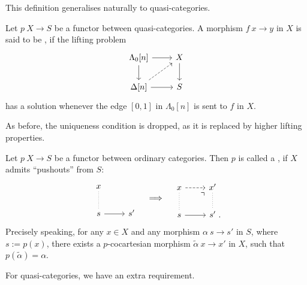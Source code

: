 This definition generalises naturally to quasi-categories.

\begin{definition}
    Let $p\:X\to S$ be a functor between quasi-categories.
    A morphism $f\:x\to y$ in $X$ is said to be ,
    if the lifting problem 
    \[\begin{tikzcd}
        \Lambda_0[n] \ar[d] \ar[r] & X \ar[d] \\
        \Delta[n] \ar[r] \ar[ur,dashed] & S
    \end{tikzcd}\]
    has a solution whenever the edge $[0,1]$ in $\Lambda_0[n]$ is sent to $f$ in $X$.
\end{definition}

As before, the uniqueness condition is dropped,
as it is replaced by higher lifting properties.

\begin{definition}
    Let $p\:X\to S$ be a functor between ordinary categories.
    Then $p$ is called a , if $X$ admits ``pushouts'' from $S$:
    \[\begin{tikzcd}
        x\ar[d,dotted,dash] \\
        s \ar[r] & s'
    \end{tikzcd}\quad\Longrightarrow\quad\begin{tikzcd}
        x\ar[r,dashed]\ar[d,dotted,dash] & x'\ar[d,dotted,dash] \\
        s \ar[r]\ar[ur,phantom,end anchor=south west,very near end,"\urcorner"] & s'\rlap{\ .}
    \end{tikzcd}\]
    Precisely speaking, for any
    $x\in X$ and any morphism $\alpha\:s\to s'$ in $S$,
    where $s:=p(x)$,
    there exists a $p$-cocartesian morphism $\tilde\alpha\:x\to x'$ in $X$,
    such that $p(\tilde\alpha)=\alpha$.
\end{definition}

For quasi-categories, we have an extra requirement.

